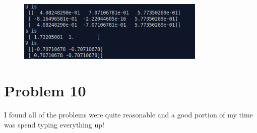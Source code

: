 \documentclass[10pt,a4paper]{article}
\begin{document}
	\begin{figure}
		\centering
			\includegraphics[width=0.8\textwidth]{svd}
	\end{figure}

	\section{Problem 10}
	I found all of the problems were quite reasonable and a good portion of my time was spend typing everything up!
	
	
	
	
	
	
	
	
	
	
	
	
\end{document}
